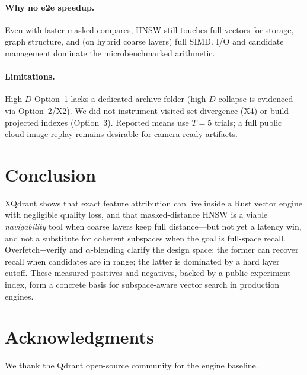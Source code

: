 \documentclass[11pt,a4paper]{article}
\begin{document}
\paragraph{Why no e2e speedup.}
Even with faster masked compares, HNSW still touches full vectors for storage,
graph structure, and (on hybrid coarse layers) full SIMD.
I/O and candidate management dominate the microbenchmarked arithmetic.

\paragraph{Limitations.}
High-$D$ Option~1 lacks a dedicated archive folder (high-$D$ collapse is evidenced
via Option~2/X2).
We did not instrument visited-set divergence (X4) or build projected indexes
(Option~3).
Reported means use $T{=}5$ trials; a full public cloud-image replay remains
desirable for camera-ready artifacts.

\section{Conclusion}
\label{sec:conclusion}

XQdrant shows that exact feature attribution can live inside a Rust vector engine
with negligible quality loss, and that masked-distance HNSW is a viable
\emph{navigability} tool when coarse layers keep full distance---but not yet a
latency win, and not a substitute for coherent subspaces when the goal is
full-space recall.
Overfetch+verify and $\alpha$-blending clarify the design space: the former can
recover recall when candidates are in range; the latter is dominated by a hard
layer cutoff.
These measured positives and negatives, backed by a public experiment index, form
a concrete basis for subspace-aware vector search in production engines.

\section*{Acknowledgments}
We thank the Qdrant open-source community for the engine baseline.
\end{document}
